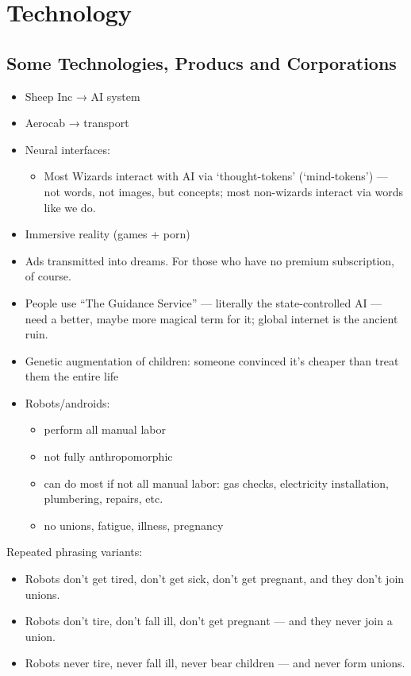 \documentclass[12pt]{article}
\begin{document}
\section{Technology}

\subsection{Some Technologies, Producs and Corporations}

\begin{itemize}
  \item Sheep Inc → AI system
  \item Aerocab → transport
  \item Neural interfaces:
  \begin{itemize}
    \item Most Wizards interact with AI via ‘thought-tokens’ (‘mind-tokens’) — not words, not images, but concepts; most non-wizards interact via words like we do.
  \end{itemize}
  \item Immersive reality (games + porn)
  \item Ads transmitted into dreams. For those who have no premium subscription, of course.
  \item People use “The Guidance Service” — literally the state-controlled AI — need a better, maybe more magical term for it; global internet is the ancient ruin.
  \item Genetic augmentation of children: someone convinced it’s cheaper than treat them the entire life
  \item Robots/androids:
  \begin{itemize}
    \item perform all manual labor
    \item not fully anthropomorphic
    \item can do most if not all manual labor: gas checks, electricity installation, plumbering, repairs, etc.
    \item no unions, fatigue, illness, pregnancy
  \end{itemize}
\end{itemize}

Repeated phrasing variants:
\begin{itemize}
  \item Robots don’t get tired, don’t get sick, don’t get pregnant, and they don’t join unions.
  \item Robots don’t tire, don’t fall ill, don’t get pregnant — and they never join a union.
  \item Robots never tire, never fall ill, never bear children — and never form unions.
\end{itemize}
\end{document}
